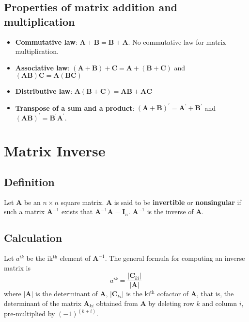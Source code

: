 \documentclass[a4paper,11pt]{article}
\begin{document}
\subsection{Properties of matrix addition and multiplication}
\label{sec:orgf70ad29}

\begin{itemize}
\item \textbf{Commutative law}: \(\mathbf{A} + \mathbf{B} = \mathbf{B} +
     \mathbf{A}\). No commutative law for matrix multiplication.

\item \textbf{Associative law}: \((\mathbf{A} + \mathbf{B}) + \mathbf{C} =
     \mathbf{A} + (\mathbf{B} + \mathbf{C})\) and \((\mathbf{AB})
     \mathbf{C} = \mathbf{A} (\mathbf{BC})\)

\item \textbf{Distributive law}: \(\mathbf{A} (\mathbf{B} + \mathbf{C}) =
     \mathbf{AB} + \mathbf{AC}\)

\item \textbf{Transpose of a sum and a product}: \((\mathbf{A} +
  \mathbf{B})^{\prime} = \mathbf{A}^{\prime} + \mathbf{B}^{\prime}\)
and \((\mathbf{A} \mathbf{B})^{\prime} = \mathbf{B}^{\prime}
  \mathbf{A}^{\prime}\).
\end{itemize}


\section{Matrix Inverse}
\label{sec:org21481d8}

\subsection{Definition}
\label{sec:orgd377cc4}

Let \(\mathbf{A}\) be an \(n \times n\) square matrix. \(\mathbf{A}\) is
said to be \textbf{invertible} or \textbf{nonsingular} if such a matrix
\(\mathbf{A}^{-1}\) exists that \(\mathbf{A}^{-1} \mathbf{A} =
\mathbf{I}_n\). \(\mathbf{A}^{-1}\) is the inverse of \(\mathbf{A}\).


\subsection{Calculation}
\label{sec:orgd1b0bdb}

Let \(a^{ik}\) be the ik\(^{\text{th}}\) element of \(\mathbf{A}^{-1}\). The general
formula for computing an inverse matrix is \[ a^{ik} =
\frac{|\mathbf{C}_{ki}|}{|\mathbf{A}|} \] where \(| \mathbf{A} |\) is
the determinant of \(\mathbf{A}\), \(| \mathbf{C}_{ki} |\) is the ki\(^{\text{th}}\)
cofactor of \(\mathbf{A}\), that is, the determinant of the matrix
\(\mathbf{A}_{ki}\) obtained from \(\mathbf{A}\) by deleting row \(k\) and
column \(i\), pre-multiplied by \((-1)^{(k + i)}\).
\end{document}
